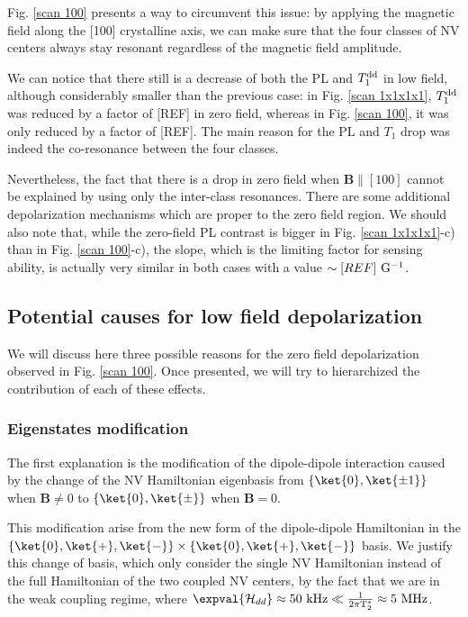 \documentclass[a4paper,11pt]{report}
\begin{document}
Fig. \ref{scan 100} presents a way to circumvent this issue: by applying the magnetic field along the [100] crystalline axis, we can make sure that the four classes of NV centers always stay resonant regardless of the magnetic field amplitude.

We can notice that there still is a decrease of both the PL and $T_1^{\rm dd}$ in low field, although considerably smaller than the previous case: in Fig. \ref{scan 1x1x1x1}, $T_1^{\rm dd}$ was reduced by a factor of [REF] in zero field, whereas in Fig. \ref{scan 100}, it was only reduced by a factor of [REF]. The main reason for the PL and $T_1$ drop was indeed the co-resonance between the four classes.

Nevertheless, the fact that there is a drop in zero field when $\mathbf{B} \parallel [100]$ cannot be explained by using only the inter-class resonances. There are some additional depolarization mechanisms which are proper to the zero field region. We should also note that, while the zero-field PL contrast is bigger in Fig. \ref{scan 1x1x1x1}-c) than in Fig. \ref{scan 100}-c), the slope, which is the limiting factor for sensing ability, is actually very similar in both cases with a value $\sim [REF]\ \rm G^{-1}$.

\subsection{Potential causes for low field depolarization}

We will discuss here three possible reasons for the zero field depolarization observed in Fig. \ref{scan 100}. Once presented, we will try to hierarchized the contribution of each of these effects.

\subsubsection{Eigenstates modification}
The first explanation is the modification of the dipole-dipole interaction caused by the change of the NV Hamiltonian eigenbasis from $\{ \ket{0}, \ket{\pm 1} \}$ when $\mathbf{B} \neq 0$ to $\{ \ket{0}, \ket{\pm} \}$ when $\mathbf{B} = 0$.

This modification arise from the new form of the dipole-dipole Hamiltonian in the $\{ \ket{0}, \ket{+}, \ket{-} \} \times \{ \ket{0}, \ket{+}, \ket{-} \}$ basis. We justify this change of basis, which only consider the single NV Hamiltonian instead of the full Hamiltonian of the two coupled NV centers, by the fact that we are in the weak coupling regime, where $\expval{\mathcal{H}_{dd}} \approx 50\ \rm kHz \ll \frac{1}{2\pi T_2^*} \approx 5\ \rm MHz$.
\end{document}
